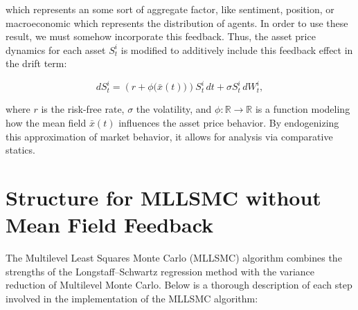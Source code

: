 \documentclass[titlepage]{article}
\begin{document}
which represents an some sort of aggregate factor, like sentiment, position, or macroeconomic which represents the distribution of agents. In order to use these result, we must somehow incorporate this feedback. Thus, the asset price dynamics for each asset \(S_t^i\) is modified to additively include this feedback effect in the drift term:

\begin{equation}
dS_t^i = \left( r + \phi\big(\bar{x}(t)\big) \right) S_t^i \, dt + \sigma S_t^i \, dW_t^i,
\label{eq:asset_dynamics_mfg}
\end{equation}

where \(r\) is the risk-free rate, \(\sigma\) the volatility, and \(\phi: \mathbb{R} \to \mathbb{R}\) is a function modeling how the mean field \(\bar{x}(t)\) influences the asset price behavior. By endogenizing this approximation of market behavior, it allows for analysis via comparative statics.

\section{Structure for MLLSMC without Mean Field Feedback}

The Multilevel Least Squares Monte Carlo (MLLSMC) algorithm combines the strengths of the Longstaff–Schwartz regression method with the variance reduction of Multilevel Monte Carlo. Below is a thorough description of each step involved in the implementation of the MLLSMC algorithm:
\end{document}

